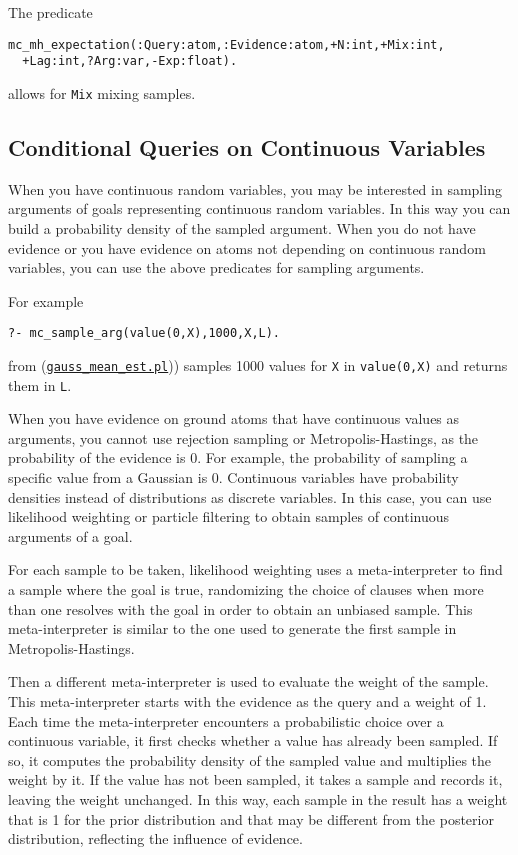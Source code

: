 The predicate
\begin{verbatim}
mc_mh_expectation(:Query:atom,:Evidence:atom,+N:int,+Mix:int,
  +Lag:int,?Arg:var,-Exp:float).
\end{verbatim}
allows for \verb|Mix| mixing samples.

\subsection{Conditional Queries on Continuous Variables}
\label{condqcont}

When you have continuous random variables, you may be interested in 
sampling arguments of goals representing continuous random variables.
In this way you can build a probability density of the sampled argument.
When you do not have evidence or you have evidence on atoms not depending
on continuous random variables, you can use the above predicates for sampling
arguments.

For example
\begin{verbatim}
?- mc_sample_arg(value(0,X),1000,X,L).
\end{verbatim}
from (\href{http://cplint.lamping.unife.it/example/inference/gauss_mean_est.pl}{\texttt{gauss\_mean\_est.pl}})) samples 1000 values for \verb|X| in
\verb|value(0,X)| and returns them in \verb|L|.

When you have evidence on ground atoms that have continuous values as 
arguments, you cannot use rejection sampling or Metropolis-Hastings,
as the probability of the evidence is 0. For example,
the probability of sampling a specific value from a Gaussian is 0. 
Continuous variables have probability densities instead of distributions as 
discrete variables.
In this case, you can use likelihood weighting or particle filtering \cite{fung1990weighing,koller2009probabilistic,Nitti2016} to obtain samples of 
continuous arguments of a goal.

For each sample to be taken, likelihood weighting
uses a meta-interpreter to find a sample where 
the goal is true, randomizing the choice of 
clauses when more than one resolves with the goal 
in order to obtain an unbiased sample.
This meta-interpreter is similar to the one used 
to generate the first sample in Metropolis-Hastings.

Then a different meta-interpreter is used to evaluate
the weight of the sample.
This meta-interpreter starts with the evidence as the query and a weight of 1. Each time the meta-interpreter encounters 
a probabilistic choice over a continuous variable, it first checks whether a
value has already been sampled.
If so, it computes the probability density of the sampled value and multiplies the weight by it. If the value has not been sampled, it takes a sample and records it, 
leaving the weight unchanged. 
In this way, each sample in the result has a weight that is 1 for the prior distribution and that may be different from the posterior distribution,
reflecting the influence of evidence.

